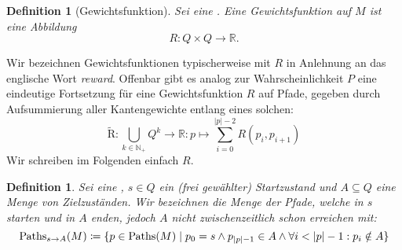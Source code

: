 \documentclass[a4paper]{article}
\newtheorem{definition}[satz]{Definition} %
\theoremstyle{nonumberplain}
\begin{document}
\newcommand{\reward}{Gewichtsfunktion}
\begin{definition}[\reward]
	Sei \mcex{} eine \mc{}. Eine \reward{} auf $M$ ist eine Abbildung
	\begin{equation}
	R : Q \times Q \to \mathbb{R}\text{.}
	\end{equation} 
\end{definition}
Wir bezeichnen Gewichtsfunktionen typischerweise mit $R$ in Anlehnung an das englische Wort \textit{reward}.
Offenbar gibt es analog zur Wahrscheinlichkeit $P$ eine eindeutige Fortsetzung für eine \reward{} $R$ auf Pfade, gegeben durch Aufsummierung aller Kantengewichte entlang eines solchen:
\begin{equation}
	\mathrm{\tilde{R}} : \bigcup_{k \in \mathbb{N}_+}{Q^k} \to \mathbb{R} : p \mapsto \sum_{i = 0}^{|p| - 2}{R(p_i,p_{i+1})}
\end{equation}
Wir schreiben im Folgenden einfach $R$.
\begin{definition}\label{def-path-to}
	Sei \mcex{} eine \mc{}, $s \in Q$ ein (frei gewählter) Startzustand und $A \subseteq Q$ eine Menge von Zielzuständen. Wir bezeichnen die Menge der Pfade, welche in $s$ starten und in $A$ enden, jedoch $A$ nicht zwischenzeitlich schon erreichen mit:
	\begin{equation}
		\mathrm{Paths}_{s \rightarrow A}(M) \coloneqq \{ p \in \mathrm{Paths}(M) \mid p_0 = s \land p_{|p|-1} \in A \land \forall i < |p| - 1 : p_i \notin A \}
	\end{equation}
	
\end{definition}
\end{document}

